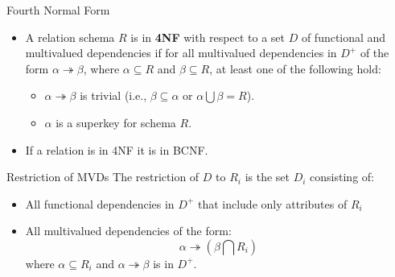 \documentclass[aspectratio=169]{beamer}
\begin{document}

\begin{frame}{Fourth Normal Form}
    \begin{itemize}
        \item A relation schema $R$ is in \textbf{4NF} with respect to a set $D$ of functional and multivalued dependencies if for all multivalued dependencies in $D^+$ of the form $\alpha \twoheadrightarrow \beta$, where $\alpha \subseteq R$ and $\beta \subseteq R$, at least one of the following hold:
            \begin{itemize}
                \item $\alpha \twoheadrightarrow \beta$ is trivial (i.e., $\beta \subseteq \alpha$ or $\alpha \bigcup \beta = R$).
                \item $\alpha$ is a superkey for schema $R$.
            \end{itemize}
        \item If a relation is in 4NF it is in BCNF.
    \end{itemize}
\end{frame}

\begin{frame}{Restriction of MVDs}
    The restriction of $D$ to $R_i$ is the set $D_i$ consisting of:
        \begin{itemize}
            \item All functional dependencies in $D^+$ that include only attributes of $R_i$
            \item All multivalued dependencies of the form:
                $$
                    \alpha \twoheadrightarrow (\beta \bigcap R_i)
                $$
                where $\alpha \subseteq R_i$ and $\alpha \twoheadrightarrow \beta$ is in $D^+$.
        \end{itemize}
\end{frame}

\end{document}

